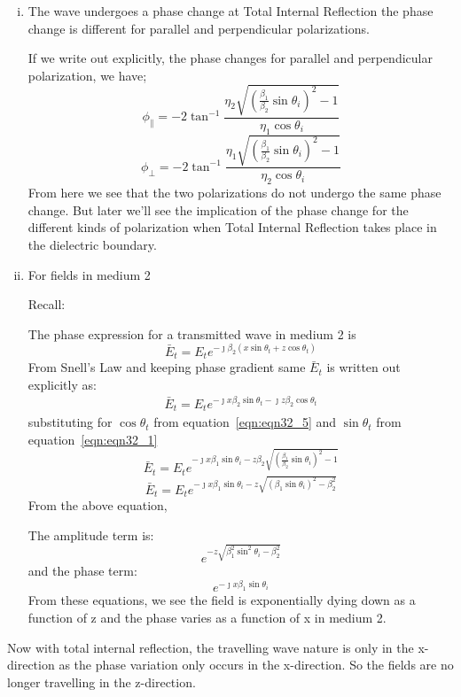 \begin{enumerate}[(i)]
\item The wave undergoes a phase change at Total Internal Reflection the phase change is different for parallel and perpendicular polarizations.

If we write out explicitly, the phase changes for parallel and perpendicular polarization, we have;
\begin{equation}
\phi_\parallel = -2\tan^{-1}\frac{\eta_2\sqrt{(\frac{\beta_1}{\beta_2}\sin\theta_i)^2-1}}{\eta_1\cos\theta_i}
\end{equation}
\begin{equation}
\phi_\perp = -2\tan^{-1}\frac{\eta_1\sqrt{(\frac{\beta_1}{\beta_2}\sin\theta_i)^2-1}}{\eta_2\cos\theta_i}
\end{equation}
From here we see that the two polarizations do not undergo the same phase change. But later we'll see the implication of the phase change for the different kinds of polarization when Total Internal Reflection takes place in the dielectric boundary. 

\item For fields in medium 2

Recall:

The phase expression for a transmitted wave in medium 2 is
\begin{equation*}
\bar{E}_t = E_{t}e^{-\jmath \beta_2(x\sin\theta_t + z\cos\theta_t)}
\end{equation*}
From Snell's Law and keeping phase gradient same $\bar{E}_t$ is written out explicitly as:
\begin{align}
\bar{E}_t = E_te^{- \jmath x\beta_2\sin\theta_t - \jmath z\beta_2\cos\theta_t}
\end{align}
substituting for $\cos\theta_t$ from equation~\ref{eqn:eqn32_5}
and $\sin\theta_t$ from equation~\ref{eqn:eqn32_1}
\begin{equation*}
\bar{E}_t = E_te^{- {\jmath x\beta_1\sin\theta_i}  -  z \beta_2\sqrt{{(\frac{\beta_1}{\beta_2}\sin\theta_i)}^2 - 1}}
\end{equation*}
\begin{equation}
\bar{E}_t = E_te^{- {\jmath x\beta_1\sin\theta_i}  -  z \sqrt{{(\beta_1\sin\theta_i)}^2 - \beta_{2}^{2}}}
\end{equation}
From the above equation,

The amplitude term is:
\begin{equation}
e^{-z\sqrt{\beta_1^2\sin^2\theta_i - \beta_2^{2}}}
\label{eqn:amplitude_term_total_internal_reflection}
\end{equation}
and the phase term:
\begin{equation}
e^{- \jmath x\beta_1\sin\theta_i}
\label{eqn:phase_term_total_internal_reflection}
\end{equation}
From these equations, we see the field is exponentially dying down as a function of z and the phase varies as a function of x in medium 2.
\end{enumerate}
Now with total internal reflection, the travelling wave nature is only in the x-direction as the phase variation only occurs in the x-direction. So the fields are no longer travelling in the z-direction.

